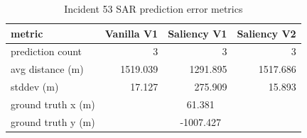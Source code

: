 \begin{table}[ht]
\centering
\caption{Incident 53 SAR prediction error metrics}
\label{tab:sar-incident-53}
\begin{tabular}{lrrr}
\hline
metric & Vanilla V1 & Saliency V1 & Saliency V2 \\
\hline
prediction count & 3 & 3 & 3 \\
avg distance (m) & 1519.039 & 1291.895 & 1517.686 \\
stddev (m) & 17.127 & 275.909 & 15.893 \\
ground truth x (m) & \multicolumn{3}{c}{61.381} \\
ground truth y (m) & \multicolumn{3}{c}{-1007.427} \\
\hline
\end{tabular}
\end{table}

